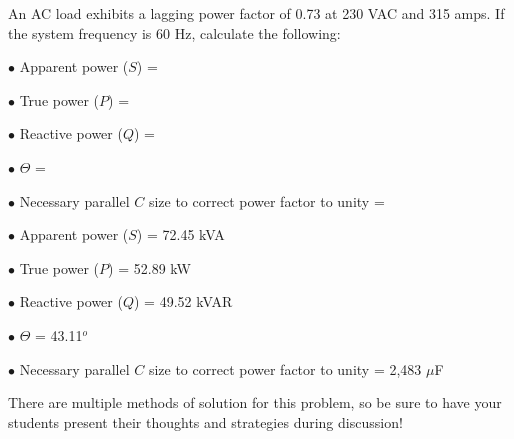 

An AC load exhibits a lagging power factor of 0.73 at 230 VAC and 315 amps.  If the system frequency is 60 Hz, calculate the following:

\medskip
\goodbreak
\item{$\bullet$} Apparent power ($S$) =
\item{$\bullet$} True power ($P$) =
\item{$\bullet$} Reactive power ($Q$) =
\item{$\bullet$} $\Theta$ =
\item{$\bullet$} Necessary parallel $C$ size to correct power factor to unity = 
\medskip







\medskip
\goodbreak
\item{$\bullet$} Apparent power ($S$) = 72.45 kVA
\item{$\bullet$} True power ($P$) = 52.89 kW
\item{$\bullet$} Reactive power ($Q$) = 49.52 kVAR
\item{$\bullet$} $\Theta$ = 43.11$^{o}$
\item{$\bullet$} Necessary parallel $C$ size to correct power factor to unity = 2,483 $\mu$F
\medskip







There are multiple methods of solution for this problem, so be sure to have your students present their thoughts and strategies during discussion!





